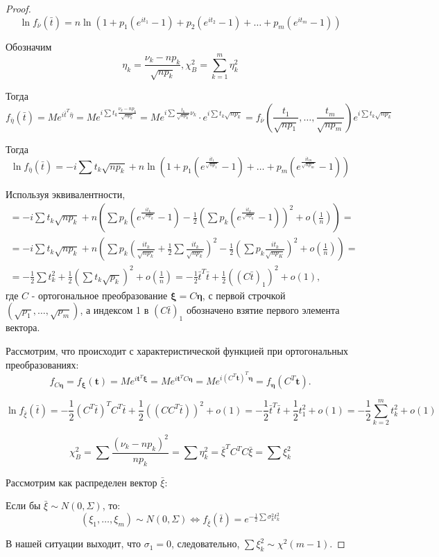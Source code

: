 \begin{proof}
  \[
    \ln f_{\bar \nu} (\bar t) = n \ln (1 + p_1 (e^{i t_1} - 1) + p_2 (e^{i t_2} - 1) + \dots + p_m (e^{i t_m} - 1))
  \]

  Обозначим
  \[
    \eta_k = \frac{\nu_k - np_k}{\sqrt{np_k}}, \chi^2_B = \sum_{k=1}^m \eta_k^2
  \]

  Тогда
  \[
    f_{\bar \eta} (\bar t) = M e^{i \bar t^T \bar \eta} =
    M e^{i \sum t_k \frac{\nu_k - np_k}{\sqrt{np_k}}} = 
    M e^{i \sum \frac{t_k}{\sqrt{np_k}} \nu_k} \cdot e^{i \sum t_k \sqrt{np_k}} = 
    f_{\bar \nu} (\frac{t_1}{\sqrt{np_1}}, \dots, \frac{t_m}{\sqrt{np_m}}) e^{i \sum t_k \sqrt{np_k}}
  \]

  Тогда
  \[
    \ln f_{\bar \eta} (\bar t) = -i \sum t_k \sqrt{np_k} + n \ln (1+p_1 (e^{\frac{i t_1}{\sqrt{np_1}}} - 1)+ \dots + p_m (e^{\frac{i t_m}{\sqrt{np_m}}} - 1) )
  \]

  Используя эквивалентности,
  \begin{multline*}
    = -i \sum t_k \sqrt{np_k} + n \left( \sum p_k \left(e^{\frac{i t_k}{\sqrt{np_k}}}
    - 1\right) - \frac{1}{2} \left(\sum p_k(e^{\frac{i t_k}{\sqrt{np_k}}} - 1)\right)^2 +
  o\left(\frac{1}{n}\right) \right) = \\
    = -i \sum t_k \sqrt{np_k} + n \left( \sum p_k \left(\frac{i t_k}{\sqrt{np_k}} +
    \frac{1}{2} \sum \frac{i t_k}{\sqrt{np_k}}\right)^2 - \frac{1}{2} \left(\sum p_k
  \frac{i t_k}{\sqrt{np_K}}\right)^2 + o\left(\frac{1}{n}\right) \right) = \\
    = - \frac{1}{2} \sum t_k^2 + \frac{1}{2} \left( \sum t_k \sqrt{p_k}
    \right)^2 + o\left(\frac{1}{n}\right)
    = - \frac{1}{2} \bar t^T \bar t + \frac{1}{2} ((C \bar t)_1)^2 + o(1),
  \end{multline*}
  где $C$ - ортогональное преобразование $\bm \xi = C \bm\eta$, с первой
  строчкой $(\sqrt{p_1}, \dots, \sqrt{p_m})$,
    а индексом 1 в $(C \bar t)_1$ обозначено взятие первого элемента вектора.

  Рассмотрим, что происходит с характеристической функцией при ортогональных преобразованиях:
  \[
    f_{C\bm\eta} = f_{\bm \xi} (\mathbf t) = M e^{i \mathbf t^T \bm \xi} = M e^{i \mathbf t^T C
    \bm\eta} =
    M e^{i (C^T \mathbf t)^T \bm \eta} = f_{\bm\eta} (C^T \mathbf t).
  \]

  \[
    \ln f_{\bar \xi} (\bar t) = - \frac{1}{2} (C^T \bar t)^T C^T \bar t + \frac{1}{2} ((C C^T \bar t))^2 + o(1) = -\frac{1}{2} \bar t^T \bar t + \frac{1}{2} t_1^2 + o(1) = - \frac{1}{2} \sum_{k=2}^m t_k^2 + o(1)
  \]

  \[
    \chi^2_B = \sum \frac{(\nu_k - np_k)^2}{np_k} = \sum \eta_k^2 = \bar \xi^T C^T C \bar \xi = \sum \xi_k^2
  \]

  Рассмотрим как распределен вектор $\bar \xi$:
  
  Если бы $\bar \xi \sim N(0, \Sigma)$, то:
  \[
    (\xi_1, \dots, \xi_m) \sim N(0, \Sigma) \Leftrightarrow f_{\bar \xi} (\bar t) = e^{-\frac{1}{2} \sum \sigma_k^2 t_k^2}
  \]

  В нашей ситуации выходит, что $\sigma_1 = 0$, следовательно, $\sum \xi_k^2 \sim \chi^2 (m-1)$.
\end{proof}

